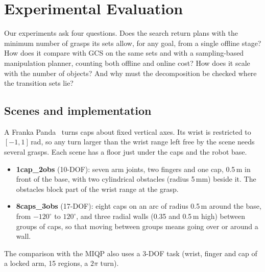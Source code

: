 \section{Experimental Evaluation}
\label{sec:experiments}

Our experiments ask four questions. Does the search return plans with the
minimum number of grasps its sets allow, for any goal, from a single offline
stage? How does it compare with GCS on the same sets and with a sampling-based
manipulation planner, counting both offline and online cost? How does it scale
with the number of objects? And why must the decomposition be checked where
the transition sets lie?

\subsection{Scenes and implementation}
A Franka Panda~\cite{haddadin2022franka} turns caps about fixed vertical axes.
Its wrist is restricted to $[-1,1]$\,rad, so any turn larger than the wrist
range left free by the scene needs several grasps. Each scene has a floor just
under the caps and the robot base.
\begin{itemize}
  \item \textbf{\textsf{1cap\_2obs}} (10-DOF): seven arm joints, two fingers
    and one cap, 0.5\,m in front of the base, with two cylindrical obstacles
    (radius 5\,mm) beside it. The obstacles block part of the wrist range at
    the grasp.
  \item \textbf{\textsf{8caps\_3obs}} (17-DOF): eight caps on an arc of radius
    0.5\,m around the base, from $-120^\circ$ to $120^\circ$, and three radial
    walls (0.35 and 0.5\,m high) between groups of caps, so that moving between
    groups means going over or around a wall.
\end{itemize}
The comparison with the MIQP also uses a 3-DOF task (wrist, finger and cap of
a locked arm, 15 regions, a $2\pi$ turn). 

